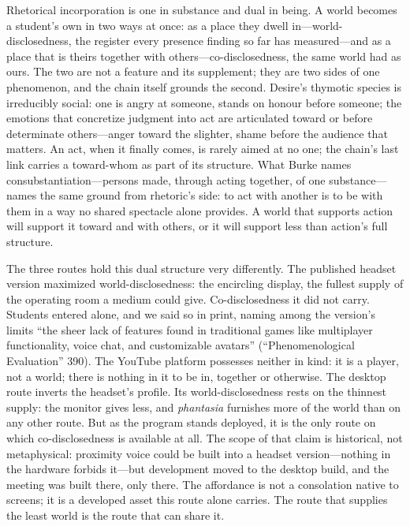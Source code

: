 Rhetorical incorporation is one in substance and dual in being. A
world becomes a student's own in two ways at once: as a place they
dwell in---world-disclosedness, the register every presence finding so
far has measured---and as a place that is theirs together with
others---co-disclosedness, the same world had as ours. The two are not
a feature and its supplement; they are two sides of one
phenomenon, and the chain itself grounds the second. Desire's thymotic
species is irreducibly social: one is angry at someone, stands on
honour before someone; the emotions that concretize judgment into act
are articulated toward or before determinate others---anger toward the
slighter, shame before the audience that matters. An act, when it
finally comes, is rarely aimed at no one; the chain's last link
carries a toward-whom as part of its structure. What Burke names
consubstantiation---persons made, through acting together, of one
substance---names the same ground from rhetoric's side: to act with
another is to be with them in a way no shared spectacle alone
provides. A world that supports action will support it toward and with
others, or it will support less than action's full structure.

The three routes hold this dual structure very differently. The
published headset version maximized world-disclosedness: the encircling
display, the fullest supply of the operating room a medium could give.
Co-disclosedness it did not carry. Students entered alone, and we said so in
print, naming among the version's limits ``the sheer lack of features
found in traditional games like multiplayer functionality, voice chat,
and customizable avatars'' (``Phenomenological Evaluation'' 390). The
YouTube platform possesses neither in kind: it is a player, not a
world; there is nothing in it to be in, together or otherwise. The
desktop route inverts the headset's profile. Its world-disclosedness
rests on the thinnest supply: the monitor gives less, and \textit{phantasia} furnishes
more of the world than on any other route. But as the program stands
deployed, it is the only route on which co-disclosedness is available
at all. The scope of that claim is historical, not metaphysical:
proximity voice could be built into a headset version---nothing in the
hardware forbids it---but development moved to the desktop build, and
the meeting was built there, only there. The affordance is not a
consolation native to screens; it is a developed asset this route
alone carries. The route that supplies the least world is the route
that can share it.

